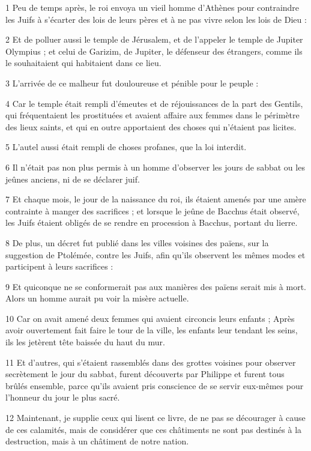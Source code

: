 \par 1 Peu de temps après, le roi envoya un vieil homme d'Athènes pour contraindre les Juifs à s'écarter des lois de leurs pères et à ne pas vivre selon les lois de Dieu :
\par 2 Et de polluer aussi le temple de Jérusalem, et de l'appeler le temple de Jupiter Olympius ; et celui de Garizim, de Jupiter, le défenseur des étrangers, comme ils le souhaitaient qui habitaient dans ce lieu.
\par 3 L'arrivée de ce malheur fut douloureuse et pénible pour le peuple :
\par 4 Car le temple était rempli d'émeutes et de réjouissances de la part des Gentils, qui fréquentaient les prostituées et avaient affaire aux femmes dans le périmètre des lieux saints, et qui en outre apportaient des choses qui n'étaient pas licites.
\par 5 L'autel aussi était rempli de choses profanes, que la loi interdit.
\par 6 Il n'était pas non plus permis à un homme d'observer les jours de sabbat ou les jeûnes anciens, ni de se déclarer juif.
\par 7 Et chaque mois, le jour de la naissance du roi, ils étaient amenés par une amère contrainte à manger des sacrifices ; et lorsque le jeûne de Bacchus était observé, les Juifs étaient obligés de se rendre en procession à Bacchus, portant du lierre.
\par 8 De plus, un décret fut publié dans les villes voisines des païens, sur la suggestion de Ptolémée, contre les Juifs, afin qu'ils observent les mêmes modes et participent à leurs sacrifices :
\par 9 Et quiconque ne se conformerait pas aux manières des païens serait mis à mort. Alors un homme aurait pu voir la misère actuelle.
\par 10 Car on avait amené deux femmes qui avaient circoncis leurs enfants ; Après avoir ouvertement fait faire le tour de la ville, les enfants leur tendant les seins, ils les jetèrent tête baissée du haut du mur.
\par 11 Et d'autres, qui s'étaient rassemblés dans des grottes voisines pour observer secrètement le jour du sabbat, furent découverts par Philippe et furent tous brûlés ensemble, parce qu'ils avaient pris conscience de se servir eux-mêmes pour l'honneur du jour le plus sacré.
\par 12 Maintenant, je supplie ceux qui lisent ce livre, de ne pas se décourager à cause de ces calamités, mais de considérer que ces châtiments ne sont pas destinés à la destruction, mais à un châtiment de notre nation.

